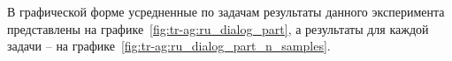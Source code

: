 В графической форме усредненные по задачам результаты данного эксперимента представлены на графике~\ref{fig:tr-ag:ru_dialog_part}, а результаты для каждой задачи -- на графике~\ref{fig:tr-ag:ru_dialog_part_n_samples}. 


